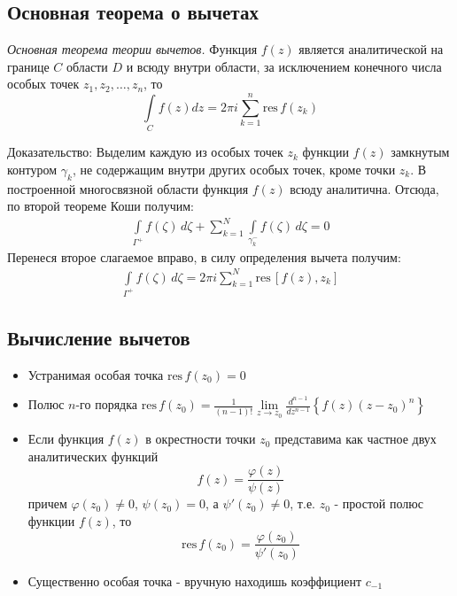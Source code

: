 \documentclass[12pt]{extarticle}
\newcommand{\res}{\mathrm{res}\,}
\renewcommand{\d}{\,d}
\begin{document}
\subsection{Основная теорема о вычетах}\label{основная теорема о вычетах}
\textit{Основная теорема теории вычетов.}
Функция $f(z)$ является аналитической на границе $C$ области $D$ и всюду
внутри области, за исключением конечного числа особых точек
$z_{1},z_{2},\ldots,z_{n}$, то
\begin{displaymath}
    \int\limits_{C}f(z)dz=2\pi i\sum\limits_{k=1}^{n}\res f(z_{k})
\end{displaymath}
\par Доказательство: Выделим каждую из особых точек $z_{k}$ функции
$f(z)$ замкнутым контуром $\gamma_{k}$, не содержащим внутри других
особых точек, кроме точки $z_{k}$. В построенной многосвязной области
функция $f(z)$ всюду аналитична. Отсюда, по второй теореме Коши получим:
\begin{eqnarray*}
    \int\limits_{\Gamma^{+}}f(\zeta)\d\zeta
    +\sum\limits_{k=1}^{N}\int\limits_{\gamma_{k}^{-}}f(\zeta)\d\zeta
    =0
\end{eqnarray*}
Перенеся второе слагаемое вправо, в силу определения вычета получим:
\begin{eqnarray*}
    \int\limits_{\Gamma^{+}}f(\zeta)\d\zeta
    =2\pi i\sum\limits_{k=1}^{N}\res[f(z),z_{k}]
\end{eqnarray*}




\subsection{Вычисление вычетов}

\begin{itemize}
    \itemsep0em
    \item Устранимая особая точка
        \subitem $\res f(z_{0}) = 0$
    \item Полюс $n$-го порядка
        \subitem $\res
        f(z_{0})=\frac{1}{(n-1)!}\lim\limits_{z\rightarrow
        z_{0}}\frac{d^{n-1}}{dz^{n-1}}\left\{f(z)(z-z_{0})^{n}\right\}$
    \item Если функция $f(z)$ в окрестности точки $z_{0}$ представима
        как частное двух аналитических функций
        \begin{displaymath}
            f(z)=\frac{\varphi(z)}{\psi(z)}
        \end{displaymath}
        причем $\varphi(z_{0})\neq 0$, $\psi(z_{0})=0$, а
        $\psi'(z_{0})\neq 0$, т.е. $z_{0}$ - простой полюс функции
        $f(z)$, то
        \begin{displaymath}
            \res f(z_{0})=\frac{\varphi(z_{0})}{\psi'(z_{0})}
        \end{displaymath}
    \item Существенно особая точка - вручную находишь коэффициент $c_{-1}$
\end{itemize}
\end{document}
